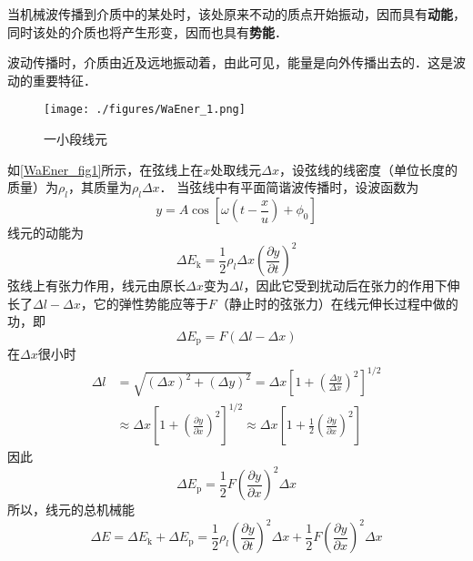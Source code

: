 

当机械波传播到介质中的某处时，该处原来不动的质点开始振动，因而具有\textbf{动能}，同时该处的介质也将产生形变，因而也具有\textbf{势能}．

波动传播时，介质由近及远地振动着，由此可见，能量是向外传播出去的．这是波动的重要特征．

\begin{figure}[ht]
\centering
\texttt{[image: ./figures/WaEner\_1.png]}
\caption{一小段线元} \label{WaEner_fig1}
\end{figure}

如\autoref{WaEner_fig1}所示，在弦线上在$x$处取线元$\Delta x$，设弦线的线密度（单位长度的质量）为$\rho_l$，其质量为$\rho_l\Delta x$．
当弦线中有平面简谐波传播时，设波函数为
\begin{equation}
y=A \cos \left[\omega\left(t-\frac{x}{u}\right)+\phi_{0}\right]
\end{equation}
线元的动能为
\begin{equation}
\Delta E_{\mathrm{k}}=\frac{1}{2} \rho_{l} \Delta x\left(\frac{\partial y}{\partial t}\right)^{2}
\end{equation}
弦线上有张力作用，线元由原长$\Delta x$变为$\Delta l$，因此它受到扰动后在张力的作用下伸长了$\Delta l-\Delta x$，它的弹性势能应等于$F$（静止时的弦张力）在线元伸长过程中做的功，即
\begin{equation}
\Delta E_{\mathrm{p}}=F(\Delta l-\Delta x)
\end{equation}
在$\Delta x$很小时
\begin{equation}
\begin{aligned} \Delta l &=\sqrt{(\Delta x)^{2}+(\Delta y)^{2}}=\Delta x\left[1+\left(\frac{\Delta y}{\Delta x}\right)^{2}\right]^{1 / 2} \\ & \approx \Delta x\left[1+\left(\frac{\partial y}{\partial x}\right)^{2}\right]^{1 / 2} \approx \Delta x\left[1+\frac{1}{2}\left(\frac{\partial y}{\partial x}\right)^{2}\right] \end{aligned}
\end{equation}
因此
\begin{equation}
\Delta E_{\mathrm{p}}=\frac{1}{2} F\left(\frac{\partial y}{\partial x}\right)^{2} \Delta x
\end{equation}
所以，线元的总机械能
\begin{equation}
\Delta E=\Delta E_{\mathrm{k}}+\Delta E_{\mathrm{p}}=\frac{1}{2} \rho_{l}\left(\frac{\partial y}{\partial t}\right)^{2} \Delta x+\frac{1}{2} F\left(\frac{\partial y}{\partial x}\right)^{2} \Delta x
\end{equation}
